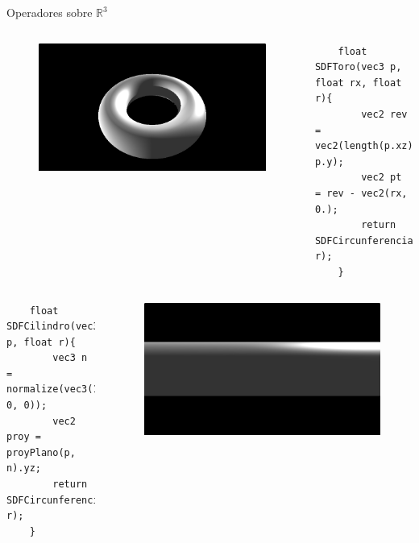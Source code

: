 \begin{frame}[fragile]{Operadores sobre \(\mathbb{R}^3\)}

    \begin{columns}[c, onlytextwidth]
        \column{1.5in}
            \begin{figure}[H]
              \centering
              \includegraphics[width=1.0\textwidth]{imagenes/sdf/3d/sdf_toro.png}
            \end{figure}
        
        \column{\dimexpr\paperwidth-10pt}
        
            \begin{lstlisting}
    float SDFToro(vec3 p, float rx, float r){   
        vec2 rev = vec2(length(p.xz), p.y);
        vec2 pt = rev - vec2(rx, 0.);
        return SDFCircunferencia(pt, r);
    }
            \end{lstlisting}
        
    \end{columns}
    
    \begin{columns}[c, onlytextwidth]
        \column{\dimexpr\paperwidth-140pt}
            \begin{lstlisting}
    float SDFCilindro(vec3 p, float r){
        vec3 n = normalize(vec3(1, 0, 0));
        vec2 proy = proyPlano(p, n).yz;
        return SDFCircunferencia(proy, r);
    }
            \end{lstlisting}
    
        \column{1.5in}
            \begin{figure}[H]
              \centering
              \includegraphics[width=1.0\textwidth]{imagenes/sdf/3d/sdf_cilindro_infinito.png}
            \end{figure}
        

\end{columns}
\end{frame}
